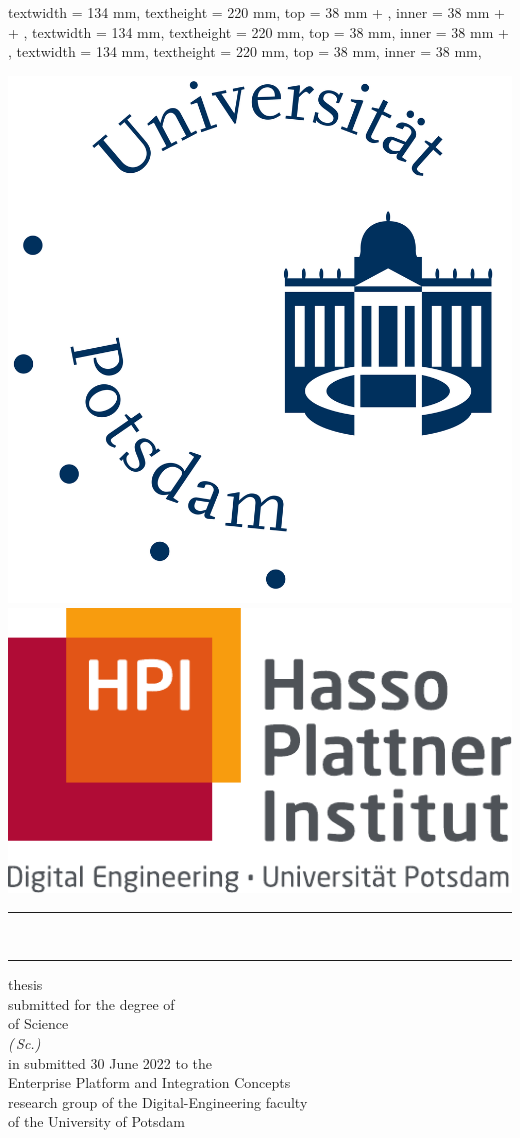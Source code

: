 
\ifprintVersion
	\ifprofessionalPrint
		\newgeometry
		{
			textwidth = 134 mm,
			textheight = 220 mm,
			top = 38 mm + \extraborderlength,
			inner = 38 mm + \mybindingcorrection + \extraborderlength,
		}
	\else
		\newgeometry
		{
			textwidth = 134 mm,
			textheight = 220 mm,
			top = 38 mm,
			inner = 38 mm + \mybindingcorrection,
		}
	\fi
\else
	\newgeometry
	{
		textwidth = 134 mm,
		textheight = 220 mm,
		top = 38 mm,
		inner = 38 mm,
	}
\fi

\begin{titlepage}
	\sffamily
	\begin{center}
		\includegraphics[height = 3.2 cm]{core/title_page/logo_UP.pdf} \hfill \includegraphics[height = 3 cm]{core/title_page/logo_HPI.pdf}\\
		\vfil
		{\LARGE
			\rule[1 ex]{\textwidth}{1.5 pt}
			\onehalfspacing\printTitleBold\\[1 ex]
			\rule[-1 ex]{\textwidth}{1 pt}
		}
		\vfil
		{\Large\textbf{\printAuthor}}
		\vfil
		{\large \colloquialDegreeName{} thesis\\[0.25 ex]
			submitted for the degree of}\\[0.25 ex]
		\bigskip
		{\Large \colloquialDegreeName{} of Science}\\[0.5 ex]
		{\large\emph{(\degreeAbbreviation\,Sc.)}}\\
		\bigskip
		{\large in
			\printProgram}
		\vfil
		{\large submitted 30 June 2022 to the\\[0.25 ex]
			Enterprise Platform and Integration Concepts\\[0.25 ex]
			research group of the Digital-Engineering faculty\\[0.25 ex]
			of the University of Potsdam}
	\end{center}


\end{titlepage}
